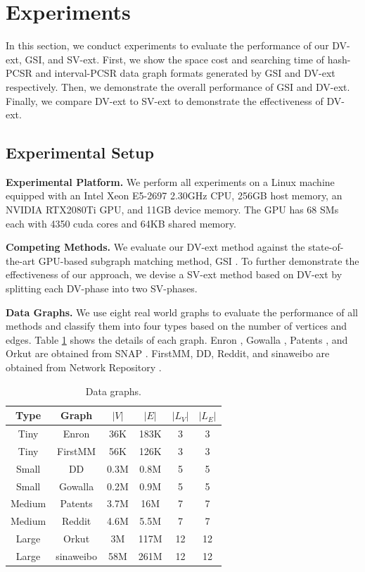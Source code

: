 \section{Experiments}
In this section, we conduct experiments to evaluate the performance of our DV-ext, GSI, and SV-ext. First, we show the space cost and searching time of hash-PCSR and interval-PCSR data graph formats generated by GSI and DV-ext respectively. Then, we demonstrate the overall performance of GSI and DV-ext. Finally, we compare DV-ext to SV-ext to demonstrate the effectiveness of DV-ext.
\subsection{Experimental Setup}
\textbf{Experimental Platform.} We perform all experiments on a Linux machine equipped with an Intel Xeon E5-2697 2.30GHz CPU, 256GB host memory, an NVIDIA RTX2080Ti GPU, and 11GB device memory. The GPU has 68 SMs each with 4350 cuda cores and 64KB shared memory.

\textbf{Competing Methods.} We evaluate our DV-ext method against the state-of-the-art GPU-based subgraph matching method, GSI \cite{zeng2020gsi}. To further demonstrate the effectiveness of our approach, we devise a SV-ext method based on DV-ext by splitting each DV-phase into two SV-phases.

\textbf{Data Graphs.} We use eight real world graphs to evaluate the performance of all methods and classify them into four types based on the number of vertices and edges. Table \ref{tab:datagraph} shows the details of each graph. Enron \cite{leskovec2009community}, Gowalla \cite{cho2011friendship}, Patents \cite{leskovec2005graphs}, and Orkut \cite{yang2015defining} are obtained from SNAP \cite{snapnets}. FirstMM, DD, Reddit, and sinaweibo are obtained from Network Repository \cite{ryan2015network,nr-sigkdd16}.

\begin{table}
\centering
  \caption{Data graphs.}
  \label{tab:datagraph}
  \begin{tabular}{cccccc}
  \hline
    Type&Graph &$|V|$&$|E|$&$|L_V|$&$|L_E|$\\
    \hline
    Tiny	&Enron		&36K	&183K	&3	&3 \\
    Tiny	&FirstMM 	&56K	&126K	&3	&3 \\
    Small	&DD			&0.3M	&0.8M	&5	&5\\
    Small	&Gowalla	&0.2M	&0.9M	&5	&5\\
    Medium	&Patents	&3.7M	&16M	&7	&7\\
    Medium	&Reddit		&4.6M	&5.5M	&7	&7\\
    Large	&Orkut		&3M		&117M	&12	&12\\
	Large	&sinaweibo	&58M	&261M	&12	&12\\

    \hline
  \end{tabular}
\end{table}

